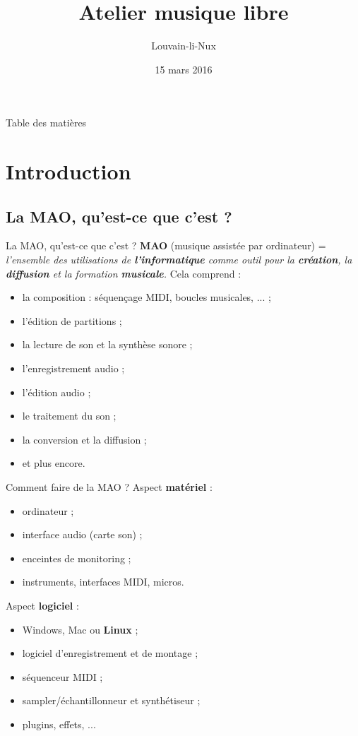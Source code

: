 \documentclass{beamer}
\title{Atelier musique libre}
\author{Louvain-li-Nux}
\date{15 mars 2016}
\begin{document}

\frame{\titlepage}

\begin{frame}{Table des matières}
  \tableofcontents
\end{frame}

\section{Introduction}
\subsection{La MAO, qu'est-ce que c'est ?}
\begin{frame}{La MAO, qu'est-ce que c'est ?}
  \textbf{MAO} (musique assistée par ordinateur) = \textit{l'ensemble des utilisations de \textbf{l'informatique} comme outil pour la \textbf{création}, la \textbf{diffusion} et la formation \textbf{musicale}.}
  Cela comprend :
  \begin{itemize}
  \item la composition : séquençage MIDI, boucles musicales, ... ;
  \item l'édition de partitions ;
  \item la lecture de son et la synthèse sonore ;
  \item l'enregistrement audio ;
  \item l'édition audio ;
  \item le traitement du son ;
  \item la conversion et la diffusion ;
  \item et plus encore.
  \end{itemize}
\end{frame}

\begin{frame}{Comment faire de la MAO ?}
  Aspect \textbf{matériel} :
  \begin{itemize}
  \item ordinateur ;
  \item interface audio (carte son) ;
  \item enceintes de monitoring ;
  \item instruments, interfaces MIDI, micros.
  \end{itemize}
  \medskip
  
  Aspect \textbf{logiciel} :
  \begin{itemize}
  \item Windows, Mac ou \textbf{Linux} ;
  \item logiciel d'enregistrement et de montage ;
  \item séquenceur MIDI ;
  \item sampler/échantillonneur et synthétiseur ;
  \item plugins, effets, ...
  \end{itemize}
\end{frame}
\end{document}
